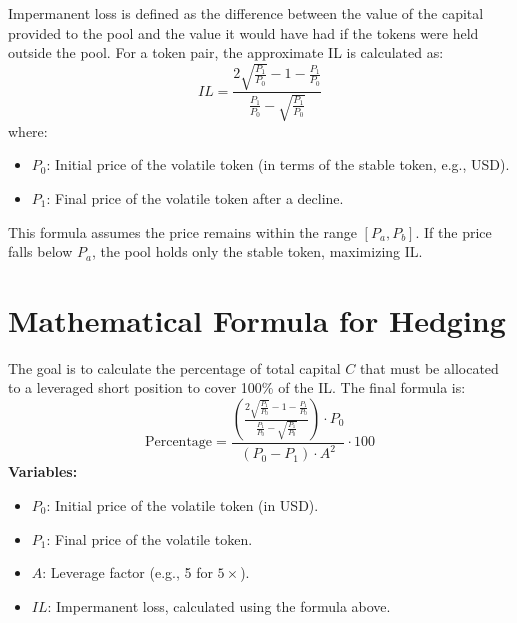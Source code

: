 \documentclass[11pt]{article}
\begin{document}
Impermanent loss is defined as the difference between the value of the capital provided to the pool and the value it would have had if the tokens were held outside the pool. For a token pair, the approximate IL is calculated as:
\begin{equation}
IL = \frac{2 \sqrt{\frac{P_1}{P_0}} - 1 - \frac{P_1}{P_0}}{\frac{P_1}{P_0} - \sqrt{\frac{P_1}{P_0}}}
\end{equation}
where:
\begin{itemize}
    \item \(P_0\): Initial price of the volatile token (in terms of the stable token, e.g., USD).
    \item \(P_1\): Final price of the volatile token after a decline.
\end{itemize}
This formula assumes the price remains within the range \([P_a, P_b]\). If the price falls below \(P_a\), the pool holds only the stable token, maximizing IL.

\section{Mathematical Formula for Hedging}
The goal is to calculate the percentage of total capital \(C\) that must be allocated to a leveraged short position to cover 100\% of the IL. The final formula is:
\begin{equation}
\text{Percentage} = \frac{\left( \frac{2 \sqrt{\frac{P_1}{P_0}} - 1 - \frac{P_1}{P_0}}{\frac{P_1}{P_0} - \sqrt{\frac{P_1}{P_0}}} \right) \cdot P_0}{\left(P_0 - P_1\right) \cdot A^2} \cdot 100
\end{equation}
\textbf{Variables:}
\begin{itemize}
    \item \(P_0\): Initial price of the volatile token (in USD).
    \item \(P_1\): Final price of the volatile token.
    \item \(A\): Leverage factor (e.g., 5 for \(5\times\)).
    \item \(IL\): Impermanent loss, calculated using the formula above.
\end{itemize}
\end{document}
